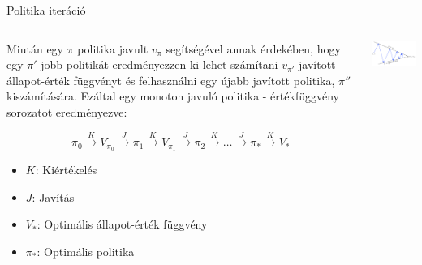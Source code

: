 \documentclass[english, aspectratio=169]{beamer}
\begin{document}
\begin{frame}{Politika iteráció}
\begin{columns}
\begin{column}{.6\textwidth}
Miután egy $\pi$ politika javult $v_\pi$ segítségével annak érdekében, hogy egy $\pi'$ jobb politikát eredményezzen ki lehet számítani $v_{\pi'}$ javított állapot-érték függvényt és felhasználni egy újabb javított politika, $\pi''$ kiszámítására. Ezáltal egy monoton javuló politika - értékfüggvény sorozatot eredményezve:
\begin{small}
\[
\pi_{0}\stackrel{K}{\longrightarrow}V_{\pi_{0}}\stackrel{J}{\longrightarrow}\pi_{1}\stackrel{K}{\longrightarrow}V_{\pi_{1}}\stackrel{J}{\longrightarrow}\pi_{2}\stackrel{K}{\longrightarrow}\hdots\stackrel{J}{\longrightarrow}\pi_{*}\stackrel{K}{\longrightarrow}V_{*}
\]
\begin{itemize}
	\item $K$: Kiértékelés
	\item $J$: Javítás
	\item $V_{*}$: Optimális állapot-érték függvény
	\item $\pi_{*}$: Optimális politika
\end{itemize}
\end{small}
\end{column}
\begin{column}{.4\textwidth}
\begin{center}
\includegraphics[width=6cm, keepaspectratio]{images/solving_11.png}
\end{center}
\end{column}
\end{columns}
\end{frame}
\end{document}

